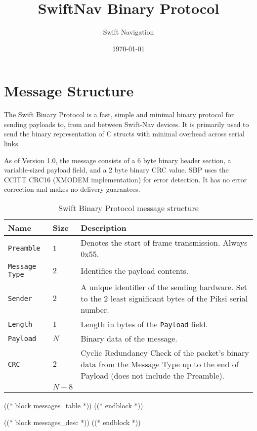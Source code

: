 \documentclass{article}
\title{SwiftNav Binary Protocol}
\author{Swift Navigation}
\date{\today}
\numberwithin{table}{subsection}
\numberwithin{field}{subsection}
\begin{document}
\maketitle

\thispagestyle{firstpage}

\section{Message Structure}
\label{sec:Message}


\begin{large}
The Swift Binary Protocol is a fast, simple and minimal binary
protocol for sending payloads to, from and between Swift-Nav
devices. It is primarily used to send the binary representation of C
structs with minimal overhead across serial links.

As of Version 1.0, the message consists of a 6 byte binary header
section, a variable-sized payload field, and a 2 byte binary CRC
value. SBP uses the CCITT CRC16 (XMODEM implementation) for error
detection. It has no error correction and makes no delivery
guarantees.
\end{large}

\begin{table}[h]
  \centering
  \begin{tabularx}{\textwidth}{aaX}
    \toprule
    Name & Size & Description \\
    \midrule
    \texttt{Preamble} & $1$ & Denotes the start of frame transmission. Always 0x55. \\
    \texttt{Message Type} & $2$ & Identifies the payload contents. \\
    \texttt{Sender} & $2$ & A unique identifier of the sending hardware. Set to the 2 least significant bytes of the Piksi serial number. \\
    \texttt{Length} & $1$ & Length in bytes of the \texttt{Payload} field. \\
    \texttt{Payload} & $N$ & Binary data of the message. \\
    \texttt{CRC} & $2$ & Cyclic Redundancy Check of the packet's binary data from the Message Type up to the end of Payload (does not include the Preamble). \\
    \midrule
    & $N+8$ \\
    \bottomrule
  \end{tabularx}
  \caption{Swift Binary Protocol message structure}
  \label{tab:message}
\end{table}

((* block messages_table *))
((* endblock *))

((* block messages_desc *))
((* endblock *))
\end{document}
